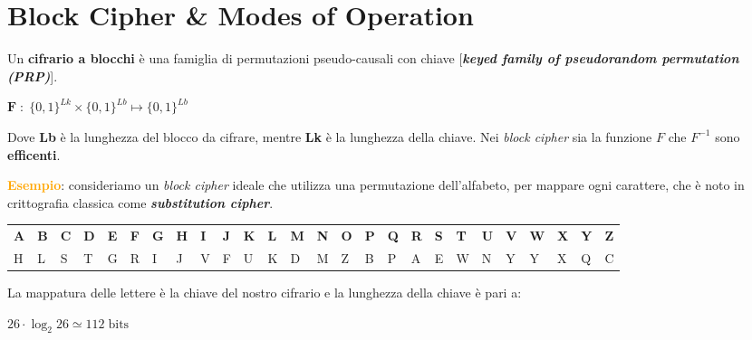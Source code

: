 \section{Block Cipher \& Modes of Operation}
Un \textbf{cifrario a blocchi} è una famiglia di permutazioni pseudo-causali con chiave [\textbf{\textit{keyed family of pseudorandom permutation (PRP)}}].

{\centering
    $\mathbf{F} \; : \; \{0, 1\}^{Lk} \times \{0, 1\}^{Lb} \mapsto \{0,1\}^{Lb}$
\par}

\begin{flushleft}
Dove \textbf{Lb} è la lunghezza del blocco da cifrare, mentre \textbf{Lk} è la lunghezza della chiave. Nei \textit{block cipher} sia la funzione $F$ che $F^{-1}$ sono \textbf{efficenti}.
\end{flushleft}

\begin{boxA}
    \textcolor{orange}{\textbf{Esempio}}: consideriamo un \textit{block cipher} ideale che utilizza una permutazione dell'alfabeto, per mappare ogni carattere, che è noto in crittografia classica come \textbf{\textit{substitution cipher}}.
    \begin{center}
        \begin{tabular}{p{0.2cm}p{0.2cm}p{0.2cm}p{0.2cm}p{0.2cm}p{0.2cm}p{0.2cm}p{0.2cm}p{0.2cm}p{0.2cm}p{0.2cm}p{0.2cm}p{0.2cm}p{0.2cm}p{0.2cm}p{0.2cm}p{0.2cm}p{0.2cm}p{0.2cm}p{0.2cm}p{0.2cm}p{0.2cm}p{0.2cm}p{0.2cm}p{0.2cm}p{0.2cm}}
            \textbf{A} & \textbf{B} & \textbf{C} & \textbf{D} & \textbf{E} & \textbf{F} & \textbf{G} & \textbf{H} & \textbf{I} & \textbf{J} & \textbf{K} & \textbf{L} & \textbf{M} & \textbf{N} & \textbf{O} & \textbf{P} & \textbf{Q} & \textbf{R} & \textbf{S} & \textbf{T} & \textbf{U} & \textbf{V} & \textbf{W} & \textbf{X} & \textbf{Y} & \textbf{Z} \\
            H & L & S & T & G & R & I & J & V & F & U & K & D & M & Z & B & P & A & E & W & N & Y & Y & X & Q & C \\
        \end{tabular}
    \end{center}
    La mappatura delle lettere è la chiave del nostro cifrario e la lunghezza della chiave è pari a:

    {\centering
        $26 \cdot \log_2 26 \simeq 112 \; \text{bits}$
    \par}
\end{boxA}

